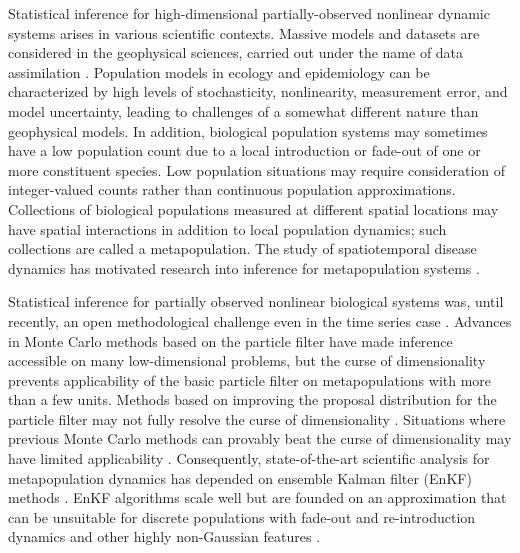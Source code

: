 \documentclass[12pt]{article}\usepackage[]{graphicx}\usepackage[]{xcolor}
\begin{document}
Statistical inference for high-dimensional partially-observed nonlinear dynamic systems arises in various scientific contexts.
Massive models and datasets are considered in the geophysical sciences, carried out under the name of data assimilation \citep{evensen09book}.
Population models in ecology and epidemiology can be characterized by high levels of stochasticity, nonlinearity, measurement error, and model uncertainty, leading to challenges of a somewhat different nature than geophysical models.
In addition, biological population systems may sometimes have a low population count due to a local introduction or fade-out of one or more constituent species.
Low population situations may require consideration of integer-valued counts rather than continuous population approximations.
Collections of biological populations measured at different spatial locations may have spatial interactions in addition to local population dynamics; such collections are called a metapopulation.
The study of spatiotemporal disease dynamics has motivated research into inference for metapopulation systems \citep{xia04,li20,park20,ionides21,cauchemez08,bjornstad19}.

Statistical inference for partially observed nonlinear biological systems was, until recently, an open methodological challenge even in the time series case \citep{bjornstad01}.
Advances in Monte Carlo methods based on the particle filter have made inference accessible on many low-dimensional problems, but the curse of dimensionality \citep{bengtsson08} prevents applicability of the basic particle filter on metapopulations with more than a few units.
Methods based on improving the proposal distribution for the particle filter may not fully resolve the curse of dimensionality \citep{snyder15}.
Situations where previous Monte Carlo methods can provably beat the curse of dimensionality may have limited applicability \citep{beskos17,park20,ionides21}.
Consequently, state-of-the-art scientific analysis for metapopulation dynamics has depended on ensemble Kalman filter (EnKF) methods \citep{li20}.
EnKF algorithms scale well but are founded on an approximation that can be unsuitable for discrete populations with fade-out and re-introduction dynamics and other highly non-Gaussian features \citep{ionides21}.
\end{document}
